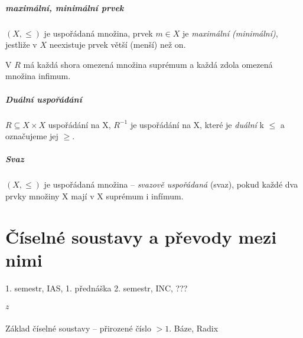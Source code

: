 \documentclass[a4wide]{report}
\begin{document}
\paragraph{maximální, minimální prvek}
$(X, \leq)$ je uspořádaná množina, prvek $m \in X$ je \emph{maximální (minimální)}, jestliže v $X$ neexistuje prvek větší (menší) než on.

V $R$ má každá shora omezená množina suprémum a každá zdola omezená množina infimum.

\paragraph{Duální uspořádání}
$R \subseteq X \times X$ uspořádání na X, $R^{-1}$ je uspořádání na X, které je \emph{duální} k $\leq$ a označujeme jej $\geq$.

\paragraph{Svaz}
$(X, \leq)$ je uspořádaná množina -- \emph{svazově uspořádaná} (svaz), pokud každé dva prvky množiny X mají v X suprémum i infímum.






































\setcounter{chapter}{17}
\chapter{Číselné soustavy a převody mezi nimi} \label{cha:18}

1. semestr, IAS, 1. přednáška
2. semestr, INC, ???

\paragraph{$z$} Základ číselné soustavy -- přirozené číslo $ > 1$. Báze, Radix
\end{document}
